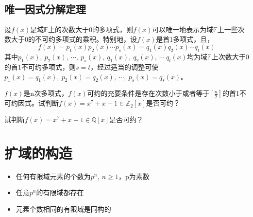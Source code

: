 \documentclass[cn,10pt]{elegantbook}
\begin{document}
\subsection{唯一因式分解定理}
\begin{theorem}
  设$f(x)$是域$\mathbb{F}$上的次数大于0的多项式，则$f(x)$可以唯一地表示为域$\mathbb{F}$上一些次数大于0的不可约多项式的乘积。特别地，设$f(x)$是首1多项式，且，
  \begin{equation*}
    f(x)=p_1(x)p_2(x)\cdots p_s(x)=q_1(x)q_2(x)\cdots q_t(x)
  \end{equation*}
  其中$p_1(x),\ p_2(x),\ \cdots ,\ p_s(x),\ q_1(x),\ q_2(x),\ \cdots \ q_t(x)$均为域$\mathbb{F}$上次数大于0的首1不可约多项式，则$s=t$，经过适当的调整可使$p_1(x)=q_1(x),\ p_2(x)= q_2(x),\ \cdots ,\ p_s(x) = q_s(x)$。
\end{theorem}
\begin{exercise}
  $f(x)$是n次多项式，$f(x)$可约的充要条件是存在次数小于或者等于$[\frac{n}{2}]$的首1不可约因式。试判断$f(x)=x^7+x+1 \in \mathbb{Z}_2[x]$是否可约？
\end{exercise}
\begin{exercise}
  试判断$f(x)=x^7+x+1 \in \mathbb{Q}[x]$是否可约？
\end{exercise}
\section{扩域的构造}
\begin{itemize}
  \item 任何有限域元素的个数为$p^n,\ n \geq 1$，p为素数
  \item 任意$p^n$的有限域都存在
  \item 元素个数相同的有限域是同构的
\end{itemize}
\end{document}
